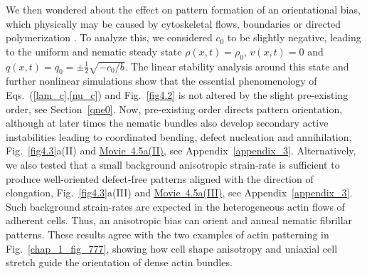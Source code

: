 We then wondered about the effect on pattern formation of an orientational bias, which physically may be caused by cytoskeletal flows, boundaries or directed polymerization \cite{hotulainen2006}. 
To analyze this, we considered  $c_0$ to be slightly negative, leading to the uniform and nematic steady state $\rho(x,t) = \rho_0$, $v(x,t) = 0$ and $q(x,t) = q_0 = \pm \frac{1}{2} \sqrt{-c_0/b}$. The linear stability analysis around this state and further nonlinear simulations show that the essential phenomenology of Eqs.~(\ref{lam_c},\ref{nu_c}) and Fig.~\ref{fig4.2} is not altered by the slight pre-existing order, see Section~\ref{qne0}. Now, pre-existing order directs pattern orientation, although at later times the nematic bundles also develop secondary active instabilities  leading to coordinated bending, defect nucleation and annihilation, Fig.~\ref{fig4.3}a(II) and \href{https://github.com/waleedmirzaPhD/movies_thesis.git}{Movie~4.5a(II)}, see Appendix~\ref{appendix_3}. Alternatively, we also tested that a small background anisotropic strain-rate is sufficient to produce well-oriented defect-free patterns aligned with the direction of elongation, Fig.~\ref{fig4.3}a(III) and  \href{https://github.com/waleedmirzaPhD/movies_thesis.git}{Movie~4.5a(III)}, see Appendix~\ref{appendix_3}. Such background strain-rates are expected in the heterogeneous actin flows of adherent cells. Thus, an anisotropic bias can orient and anneal nematic fibrillar patterns. These results agree with the two examples of actin patterning in Fig.~\ref{chap_1_fig_777},  showing how cell shape anisotropy \cite{DINWIDDIE2014404} and uniaxial cell stretch \cite{10.1083/jcb.201904144} guide the orientation of dense actin bundles.



